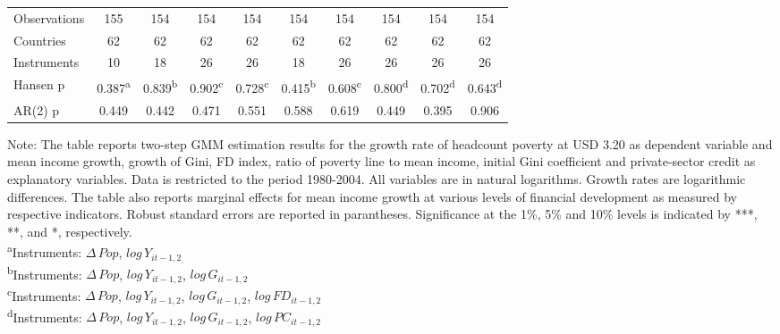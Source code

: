 \documentclass[12pt, a4paper]{article}
\begin{document}
\begin{table}
\begin{threeparttable}
{\begin{tabular}{l*{9}{c}}
				
				\hline
				Observations        &         155         &         154         &         154         &         154         &         154         &         154         &         154         &         154         &         154         \\
				Countries           &          62         &          62         &          62         &          62         &          62         &          62         &          62         &          62         &          62         \\
				Instruments         &          10         &          18         &          26         &          26         &          18         &          26         &          26         &          26         &          26         \\
				Hansen p         &       0.387\textsuperscript{a}         &       0.839\textsuperscript{b}         &       0.902\textsuperscript{c}         &       0.728\textsuperscript{c}         &       0.415\textsuperscript{b}         &       0.608\textsuperscript{c}         &       0.800\textsuperscript{d}         &       0.702\textsuperscript{d}         &       0.643\textsuperscript{d}         \\
				AR(2) p              &       0.449         &       0.442         &       0.471         &       0.551         &       0.588         &       0.619         &       0.449         &       0.395         &       0.906         \\
				\hline\hline
			\end{tabular}
		}
		\begin{tablenotes}
			\item \scriptsize{Note: The table reports two-step GMM estimation results for the growth rate of headcount poverty at USD 3.20 as dependent variable and mean income growth, growth of Gini, FD index, ratio of poverty line to mean income, initial Gini coefficient and private-sector credit as explanatory variables. Data is restricted to the period 1980-2004. All variables are in natural logarithms. Growth rates are logarithmic differences. The table also reports marginal effects for mean income growth at various levels of financial development as measured by respective indicators. Robust standard errors are reported in parantheses. Significance at the 1\%, 5\% and 10\% levels is indicated by ***, **, and *, respectively.\\
				\textsuperscript{a}Instruments: $\Delta \, Pop$, $log \, Y_{it-1,2}$}\\
			\textsuperscript{b}Instruments: $\Delta \, Pop$, $log \, Y_{it-1,2}$, $log \, G_{it-1,2}$\\
			\textsuperscript{c}Instruments: $\Delta \, Pop$, $log \, Y_{it-1,2}$, $log \, G_{it-1,2}$, $log \, FD_{it-1,2}$\\
			\textsuperscript{d}Instruments: $\Delta \, Pop$, $log \, Y_{it-1,2}$, $log \, G_{it-1,2}$, $log \, PC_{it-1,2}$\\
			

\end{tablenotes}
\end{threeparttable}
\end{table}
\end{document}

